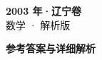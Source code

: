 \documentclass[zihao=-4, a4paper]{ctexart}
\begin{document}
\begin{center}
  {\Large\bfseries 2003 年·辽宁卷}\\[4pt]
  {\large 数学 · 解析版}
\end{center}
\medskip
{}

\clearpage
{}
\begin{center}{\Large\bfseries 参考答案与详细解析}\end{center}
\medskip

\end{document}

